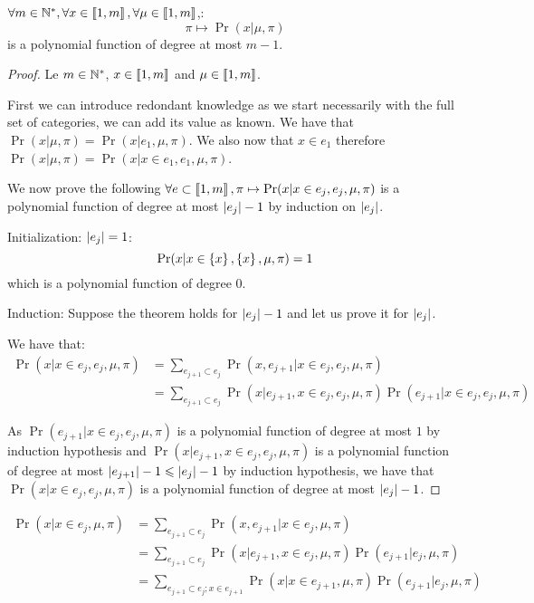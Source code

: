 \begin{thm}
    \label{thm:likelihood_bos_is_polynomial}
    $\forall m \in \mathbb{N}^*, \forall x \in \left\llbracket1, m\right\rrbracket, \forall \mu \in \left\llbracket1, m\right\rrbracket$,:
    \[ \pi \mapsto \Pr(x | \mu, \pi) \]
    is a polynomial function of degree at most $m - 1$.  
\end{thm}
\begin{proof}
    Le $m \in \mathbb{N}^*$, $x \in \left\llbracket1, m\right\rrbracket$ and $\mu \in \left\llbracket1, m\right\rrbracket$. 

    First we can introduce redondant knowledge as we start necessarily with the full set of categories, we can add its value as known. We have that $\Pr(x | \mu, \pi) = \Pr(x | e_1, \mu, \pi)$. We also now that $x \in e_1$ therefore $\Pr(x | \mu, \pi) = \Pr(x | x \in e_1, e_1, \mu, \pi)$.

    We now prove the following $\forall e \subset \left\llbracket1, m\right\rrbracket, \pi \mapsto \Pr(x | x \in e_j, e_j, \mu, \pi)$ is a polynomial function of degree at most $\left|e_j\right| - 1$ by induction on $\left|e_j\right|$.

    Initialization: $\left|e_j\right| = 1$:
    \[ \Pr(x | x \in \left\{ x \right\}, \left\{ x \right\}, \mu, \pi) = 1 \] which is a polynomial function of degree $0$.

    Induction: Suppose the theorem holds for $\left|e_j\right| - 1$ and let us prove it for $\left|e_j\right|$.

    We have that:
    \begin{align}
        \Pr(x | x \in e_j, e_j, \mu, \pi) 
        &= \sum_{e_{j+1} \subset e_j} \Pr(x, e_{j+1} | x \in e_j, e_j, \mu, \pi) \\
        &= \sum_{e_{j+1} \subset e_j} \Pr(x | e_{j+1}, x \in e_j, e_j, \mu, \pi) \Pr(e_{j+1} | x \in e_j, e_j, \mu, \pi)
    \end{align}

    As $\Pr(e_{j+1} | x \in e_j, e_j, \mu, \pi)$ is a polynomial function of degree at most $1$ by induction hypothesis and $\Pr(x | e_{j+1}, x \in e_j, e_j, \mu, \pi)$ is a polynomial function of degree at most $\left|e_{j+1}\right| - 1 \leqslant \left|e_j\right| - 1$ by induction hypothesis, we have that $\Pr(x | x \in e_j, e_j, \mu, \pi)$ is a polynomial function of degree at most $\left|e_j\right| - 1$. 
\end{proof}


\begin{align}
    \Pr(x | x \in e_j, \mu, \pi) 
    &= \sum_{e_{j+1} \subset e_j} \Pr(x, e_{j+1} | x \in e_j, \mu, \pi) \\
    &= \sum_{e_{j+1} \subset e_j} \Pr(x | e_{j+1}, x \in e_j, \mu, \pi) \Pr(e_{j+1} | e_j, \mu, \pi) \\
    &= \sum_{e_{j+1} \subset e_j ; x\in e_{j+1}} \Pr(x | x \in e_{j+1}, \mu, \pi) \Pr(e_{j+1} | e_j, \mu, \pi)
\end{align}

